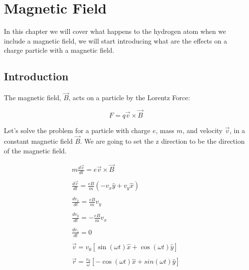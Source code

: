 \setchapterpreamble[u]{\margintoc}
\chapter{Magnetic Field}

In this chapter we will cover what happens to the hydrogen atom when we include a magnetic field, we will start introducing what are the effects on a charge particle with a magnetic field.

\section{Introduction}

The magnetic field, $\vec{B}$, acts on a particle by the Lorentz Force:

\begin{equation}
  F = q \vec{v} \times \vec{B}
\end{equation}

Let's solve the problem for a particle with charge $e$, mass $m$, and velocity $\vec{v}$, in a constant magnetic field $\vec{B}$. We are going to set the z direction to be the direction of the magnetic field.

\begin{equation}
  \begin{array}{c}
    m \frac{d\vec{v}}{dt} = e \vec{v} \times \vec{B}
    \\

    \\
    \frac{d\vec{v}}{dt} = \frac{e B}{m} (-v_x \hat{y} + v_y \hat{x})
    \\

    \\
    \frac{dv_x}{dt} = \frac{eB}{m} v_y
    \\

    \\
    \frac{dv_y}{dt} = - \frac{eB}{m} v_x
    \\

    \\
    \frac{dv_z}{dt} = 0
    \\

    \\
    \vec{v} = v_0 \left[\sin(\omega t)\hat{x}+\cos(\omega t)\hat{y}\right]
    \\

    \\
    \vec{r} = \frac{v_0}{\omega}\left[-\cos(\omega t)\hat{x} + sin(\omega t) \hat{y}\right]
  \end{array}
\end{equation}

